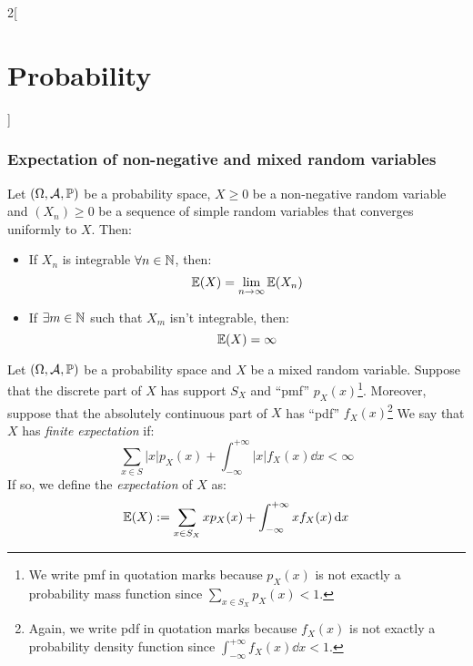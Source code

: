 \documentclass[../../../main_math.tex]{subfiles}
\begin{document}
\begin{multicols}{2}[\section{Probability}]
  \subsubsection{Expectation of non-negative and mixed random variables}
  \begin{proposition}
    Let $(\Omega,\mathcal{A},\mathbb{P})$ be a probability space, $X\geq 0$ be a non-negative random variable and $(X_n)\geq 0$ be a sequence of simple random variables that converges uniformly to $X$. Then:
    \begin{itemize}
      \item If $X_n$ is integrable $\forall n\in\mathbb{N}$, then: $$\mathbb{E}(X)=\lim_{n\to\infty}\mathbb{E}(X_n)$$
      \item If $\exists m\in\mathbb{N}$ such that $X_m$ isn't integrable, then: $$\mathbb{E}(X)=\infty$$
    \end{itemize}
  \end{proposition}
  \begin{definition}
    Let $(\Omega,\mathcal{A},\mathbb{P})$ be a probability space and $X$ be a mixed random variable. Suppose that the discrete part of $X$ has support $S_X$ and ``pmf'' $p_X(x)$\footnote{We write pmf in quotation marks because $p_X(x)$ is not exactly a probability mass function since $\sum_{x\in S_X}p_X(x)<1$.}. Moreover, suppose that the absolutely continuous part of $X$ has ``pdf'' $f_X(x)$\footnote{Again, we write pdf in quotation marks because $f_X(x)$ is not exactly a probability density function since $\int_{-\infty}^{+\infty}f_X(x)\dd{x}<1$.} We say that $X$ has \emph{finite expectation} if: $$\sum_{x\in S}|x|p_X(x)+\int_{-\infty}^{+\infty}|x|f_X(x)\dd{x}<\infty$$
    If so, we define the \emph{expectation} of $X$ as: $$\mathbb{E}(X):=\sum_{x\in S_X}xp_X(x)+\int_{-\infty}^{+\infty}xf_X(x)\dd{x}$$
  \end{definition}

\end{multicols}
\end{document}
